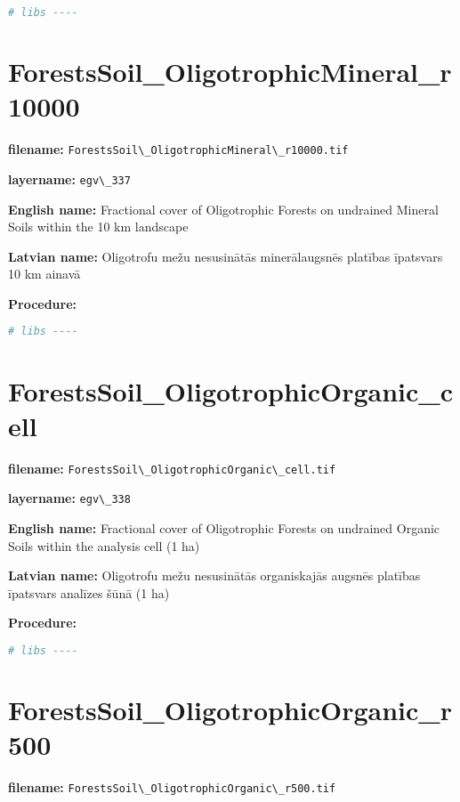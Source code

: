 \documentclass[
]{book}
\newcommand{\passthrough}[1]{#1}
\begin{document}
\begin{lstlisting}[language=R]
# libs ----
\end{lstlisting}

\section{ForestsSoil\_OligotrophicMineral\_r10000}\label{ch06.337}

\textbf{filename:} \passthrough{\lstinline!ForestsSoil\_OligotrophicMineral\_r10000.tif!}

\textbf{layername:} \passthrough{\lstinline!egv\_337!}

\textbf{English name:} Fractional cover of Oligotrophic Forests on undrained Mineral Soils within the 10 km landscape

\textbf{Latvian name:} Oligotrofu mežu nesusinātās minerālaugsnēs platības īpatsvars 10 km ainavā

\textbf{Procedure:}

\begin{lstlisting}[language=R]
# libs ----
\end{lstlisting}

\section{ForestsSoil\_OligotrophicOrganic\_cell}\label{ch06.338}

\textbf{filename:} \passthrough{\lstinline!ForestsSoil\_OligotrophicOrganic\_cell.tif!}

\textbf{layername:} \passthrough{\lstinline!egv\_338!}

\textbf{English name:} Fractional cover of Oligotrophic Forests on undrained Organic Soils within the analysis cell (1 ha)

\textbf{Latvian name:} Oligotrofu mežu nesusinātās organiskajās augsnēs platības īpatsvars analīzes šūnā (1 ha)

\textbf{Procedure:}

\begin{lstlisting}[language=R]
# libs ----
\end{lstlisting}

\section{ForestsSoil\_OligotrophicOrganic\_r500}\label{ch06.339}

\textbf{filename:} \passthrough{\lstinline!ForestsSoil\_OligotrophicOrganic\_r500.tif!}
\end{document}

